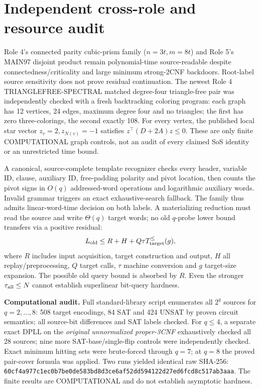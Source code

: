 \documentclass[10pt]{article}
\begin{document}
\section{Independent cross-role and resource audit}
Role 4's connected parity cubic-prism family ($n=3t,m=8t$) and Role 5's MAIN97 disjoint product remain polynomial-time source-readable despite connectedness/criticality and large minimum strong-2CNF backdoors. Root-label source sensitivity does not prove residual continuation. The newest Role 4 TRIANGLEFREE-SPECTRAL matched degree-four triangle-free pair was independently checked with a fresh backtracking coloring program: each graph has 12 vertices, 24 edges, maximum degree four and no triangles; the first has zero three-colorings, the second exactly 108. For every vertex, the published local star vector $z_v=2,z_{N(v)}=-1$ satisfies $z^\top(D+2A)z\le0$. These are only finite COMPUTATIONAL graph controls, not an audit of every claimed SoS identity or an unrestricted time bound.

A canonical, source-complete template recognizer checks every header, variable ID, clause, auxiliary ID, free-padding polarity and pivot location, then counts the pivot signs in $O(q)$ addressed-word operations and logarithmic auxiliary words. Invalid grammar triggers an exact exhaustive-search fallback. The family thus admits linear-word-time decision on both labels. A materializing reduction must read the source and write $\Theta(q)$ target words; no old $q$-probe lower bound transfers via a positive residual:
\[
L_{\rm old}\le R+H+Q\tau T_{\rm target}^{\le}(g),
\]
where $R$ includes input acquisition, target construction and output, $H$ all replay/preprocessing, $Q$ target calls, $\tau$ machine conversion and $g$ target-size expansion. The possible old query bound is absorbed by $R$. Even the stronger $\tau_{\rm all}\le N$ cannot establish superlinear bit-query hardness.

\textbf{Computational audit.} Full standard-library script enumerates all $2^q$ sources for $q=2,\ldots,8$: 508 target encodings, 84 SAT and 424 UNSAT by proven circuit semantics; all source-bit differences and SAT labels checked. For $q\le4$, a separate exact DPLL on the \emph{original unnormalized proper-3CNF} exhaustively checked all 28 sources; nine more SAT-base/single-flip controls were independently checked. Exact minimum hitting sets were brute-forced through $q=7$; at $q=8$ the proved pair-cover formula was applied. Two runs yielded identical raw SHA-256:
\texttt{60cf4a977c1ec0b7be0de583bd8d3ce6af52dd594122d27ed6fcd8c517ab3aaa}.
The finite results are COMPUTATIONAL and do not establish asymptotic hardness.
\end{document}

